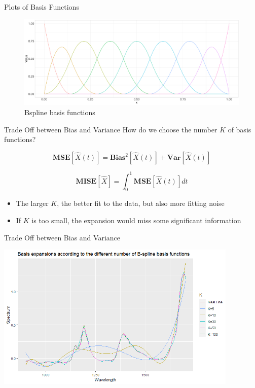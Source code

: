 \documentclass{beamer}
\begin{document}
	\begin{frame}{Plots of Basis Functions}
		\begin{figure}
			\includegraphics[height = 4.5cm]{../Graphics/Bspline_Basis.pdf}
			\caption {Bspline basis functions}
		\end{figure}
	\end{frame}
	
	\begin{frame}{Trade Off between Bias and Variance}
		How do we choose the number $K$ of basis functions?
		
		$$\textbf{MSE}[\hat{X}(t)] = \textbf{Bias}^2[\hat{X}(t)] + \textbf{Var}[\hat{X}(t)]$$
		
		$$\textbf{MISE}[\hat{X}] = \int_{0}^{1} \textbf{MSE}[\hat{X}(t)] dt$$
		
		\begin{itemize}
			\item The larger $K$, the better fit to the data, but also more fitting noise
			\item If $K$ is too small, the expansion would miss some significant information
		\end{itemize}
	\end{frame}
	
	\begin{frame}{Trade Off between Bias and Variance}
		\begin{minipage}[t]{\textwidth}
			\includegraphics[height = 7cm]{../Graphics/Tradeoff.png}
		\end{minipage}
	\end{frame}
\end{document}
